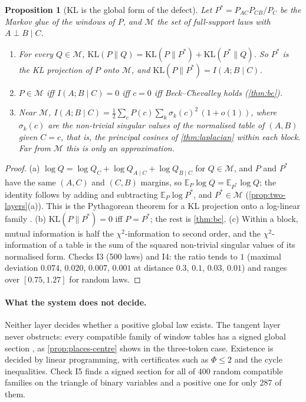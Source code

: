 \documentclass[11pt]{article}
\newtheorem{proposition}[theorem]{Proposition}
\theoremstyle{definition}
\newcommand{\KL}{\mathrm{KL}}
\newcommand{\EE}{\mathbb E}
\begin{document}
\begin{proposition}[KL is the global form of the defect]\label{prop:kl-pyth}
Let $P^*=P_{AC}P_{CB}/P_C$ be the Markov glue of the windows of $P$, and $\mathcal M$ the set of full-support laws with $A\perp B\mid C$.
\begin{enumerate}[label=(\alph*)]
\item For every $Q\in\mathcal M$, $\KL(P\|Q)=\KL(P\|P^*)+\KL(P^*\|Q)$. So $P^*$ is the KL projection of $P$ onto $\mathcal M$, and
  $\KL(P\|P^*)=I(A;B\mid C)$.
\item $P\in\mathcal M$ iff $I(A;B\mid C)=0$ iff $c=0$ iff Beck--Chevalley holds (\cref{thm:bc}).
\item Near $\mathcal M$, $I(A;B\mid C)=\tfrac12\sum_cP(c)\sum_k\sigma_k(c)^2\,(1+o(1))$, where $\sigma_k(c)$ are the non-trivial singular
  values of the normalised table of $(A,B)$ given $C=c$, that is, the principal cosines of \cref{thm:laplacian} within each block. Far
  from $\mathcal M$ this is only an approximation.
\end{enumerate}
\end{proposition}
\begin{proof}
(a) $\log Q=\log Q_C+\log Q_{A\mid C}+\log Q_{B\mid C}$ for $Q\in\mathcal M$, and $P$ and $P^*$ have the same $(A,C)$ and $(C,B)$ margins,
so $\EE_P\log Q=\EE_{P^*}\log Q$; the identity follows by adding and subtracting $\EE_P\log P^*$, and $P^*\in\mathcal M$
(\cref{prop:two-layers}(a)). This is the Pythagorean theorem for a KL projection onto a log-linear family \cite{Csiszar1975}.
(b) $\KL(P\|P^*)=0$ iff $P=P^*$; the rest is \cref{thm:bc}. (c) Within a block, mutual information is half the $\chi^2$-information to
second order, and the $\chi^2$-information of a table is the sum of the squared non-trivial singular values of its normalised form.
Checks I3 (500 laws) and I4: the ratio tends to $1$ (maximal deviation $0.074$, $0.020$, $0.007$, $0.001$ at distance $0.3$, $0.1$,
$0.03$, $0.01$) and ranges over $[0.75,1.27]$ for random laws.
\end{proof}

\paragraph{What the system does not decide.} Neither layer decides whether a positive global law exists. The tangent layer never
obstructs: every compatible family of window tables has a signed global section \cite{AbramskyBrandenburger2011}, as
\cref{prop:places-centre} shows in the three-token case. Existence is decided by linear programming, with certificates such as $\Phi\le2$
and the cycle inequalities. Check I5 finds a signed section for all of 400 random compatible families on the triangle of binary
variables and a positive one for only 287 of them.
\end{document}
